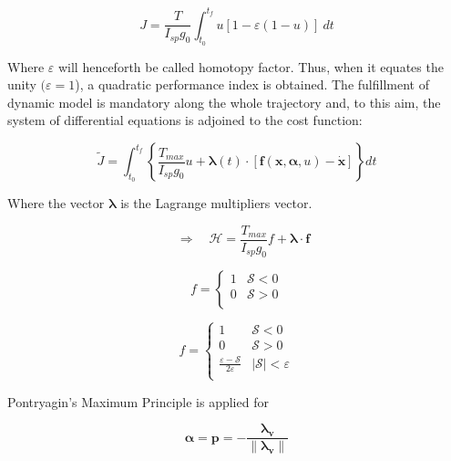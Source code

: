 \begin{equation}
J = \frac{T}{I_{sp} g_0}\int_{t_0}^{t_f}  u \left[ 1 - \varepsilon(1-u)\right]~dt
\end{equation}

Where $\varepsilon$ will henceforth be called homotopy factor. Thus, when it equates the unity $(\varepsilon=1$), a quadratic performance index is obtained. The fulfillment of dynamic model is mandatory along the whole trajectory and, to this aim, the system of differential equations is adjoined to the cost function:

\begin{equation}
\tilde{J} = \int_{t_0}^{t_f}\left\lbrace \frac{T_{max}}{I_{sp} g_0} u + \boldsymbol{\lambda}(t) \cdot \left[ \mathbf{f}(\mathbf{x}, \boldsymbol{\alpha},u ) - \mathbf{\dot{x}} \right] \right\rbrace dt
\end{equation}

Where the vector $\boldsymbol{\lambda}$ is the Lagrange multipliers vector. 

\begin{equation}
\quad
\Rightarrow
\quad
\mathcal{H} = \frac{T_{max}}{I_{sp} g_0} f+ \boldsymbol{\lambda} \cdot \mathbf{f}
\end{equation}



\begin{equation}
f
=
\begin{cases}
1 & \mathcal{S} < 0 \\
0 & \mathcal{S} > 0 \\
\end{cases}
\end{equation}

\begin{equation}
f
=
\begin{cases}
1 & \mathcal{S} < 0 \\
0 & \mathcal{S} > 0 \\
\frac{\varepsilon - \mathcal{S}}{2 \varepsilon} & |\mathcal{S}| < \varepsilon \\
\end{cases}
\end{equation}

Pontryagin's Maximum Principle is applied for 

\begin{equation}
\boldsymbol{\alpha} = \mathbf{p} = -\frac{\boldsymbol{\lambda_v}}{\parallel \boldsymbol{\lambda_v} \parallel}
\end{equation}

